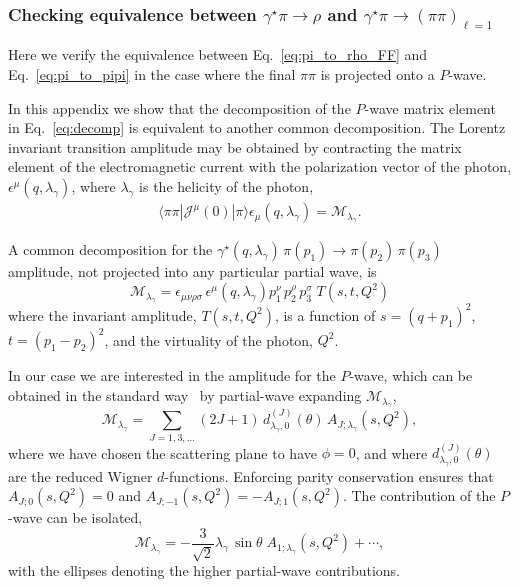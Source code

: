 \subsubsection{Checking equivalence between $\gamma^\star\pi\to\rho$ and $\gamma^\star\pi\to(\pi\pi)_{\ell=1}$}
Here we verify the equivalence between Eq.~\ref{eq:pi_to_rho_FF} and Eq.~\ref{eq:pi_to_pipi} in the case where the final $\pi\pi$ is projected onto a $P$-wave. 


{\raul

In this appendix we show that the decomposition of the $P$-wave matrix element in Eq.~\ref{eq:decomp} is equivalent to another common decomposition. The Lorentz invariant transition amplitude may be obtained by contracting the matrix element of the electromagnetic current with the polarization vector of the photon, $\epsilon^\mu(q,\lambda_\gamma)$, where $\lambda_\gamma$ is the helicity of the photon,
\begin{align}
{\langle \pi\pi|{\mathcal{J}}^{\mu}(0)| \pi\rangle}\epsilon_\mu(q,\lambda_\gamma)=
\mathcal{M}_{\lambda_\gamma}.
\end{align}


A common decomposition for the  ${\gamma^\star(q, \lambda_\gamma)\, \pi(p_1) \to \pi(p_2)\, \pi(p_3)}$ amplitude, not projected into any particular partial wave, is
\begin{equation}
\mathcal{M}_{\lambda_\gamma} = \epsilon_{\mu \nu \rho \sigma}\,  \epsilon^\mu(q,\lambda_\gamma) p_1^\nu \, p_2^\rho \, p_3^\sigma \; T(s,t,Q^2) \label{pipi_invar}
\end{equation}
where the invariant amplitude, $T(s,t,Q^2)$, is a function of $s = (q+p_1)^2$, $t = (p_1 - p_2)^2 $, and the virtuality of the photon, $Q^2$.

In our case we are interested in the amplitude for the $P$-wave, which can be obtained in the standard way~\cite{Jacob:1959at, Danilkin:2014cra} by partial-wave expanding $\mathcal{M}_{\lambda_\gamma}$,
\begin{equation}
\mathcal{M}_{\lambda_\gamma}=\sum_{J=1,3,\ldots} (2J+1) \, d^{(J)}_{\lambda_\gamma, 0}(\theta) \, A_{J; \lambda_\gamma}(s,Q^2),
\end{equation}
where we have chosen the scattering plane to have $\phi=0$, and where $d^{(J)}_{\lambda_\gamma, 0}(\theta)$ are the reduced Wigner $d$-functions. Enforcing parity conservation ensures that $A_{J; 0}(s,Q^2)=0$ and $A_{J; -1}(s,Q^2)=-A_{J; 1}(s,Q^2)$. The contribution of the $P$-wave can be isolated,
\begin{equation}
\mathcal{M}_{\lambda_\gamma}=-\frac{3}{\sqrt{2}} \lambda_\gamma \, \sin \theta \; A_{1; \lambda_\gamma}(s,Q^2) +\cdots,
\label{eq:MatPwave}
\end{equation}
with the ellipses denoting the higher partial-wave contributions. 

}
